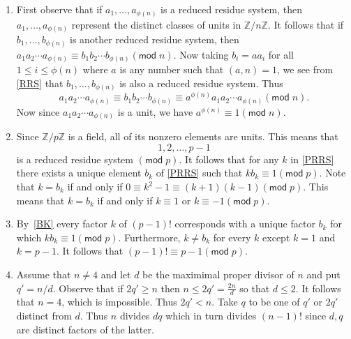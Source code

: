 \documentclass[12pt]{article}
\renewcommand{\pmod}[1]{\left(\mathsf{mod}\;#1\right)}
\begin{document}
\begin{enumerate}
\item %
First observe that if $a_1,\ldots,a_{\phi\left(n\right)}$
is a reduced residue system, then 
$a_1,\ldots,a_{\phi\left(n\right)}$ represent the distinct
classes of units in $\mathbb{Z}/n\mathbb{Z}$.
It follows that if $b_1,\ldots,b_{\phi\left(n\right)}$
is another reduced residue system, then
$a_1a_2\cdots a_{\phi\left(n\right)}
\equiv b_1b_2\cdots b_{\phi\left(n\right)}\pmod{n}$.
Now taking $b_i=aa_i$ for all $1\le i\le\phi\left(n\right)$
where $a$ is any number such that $\left(a,n\right)=1$,
we see from \autoref{RRS} that
$b_1,\ldots,b_{\phi\left(n\right)}$
is also a reduced residue system. Thus
\[a_1a_2\cdots a_{\phi\left(n\right)}
\equiv b_1b_2\cdots b_{\phi\left(n\right)}\equiv
a^{\phi\left(n\right)}a_1a_2\cdots a_{\phi\left(n\right)}
\pmod{n}.\]
Now since
$a_1a_2\cdots a_{\phi\left(n\right)}$ is a unit, we have
$a^{\phi\left(n\right)}\equiv 1\pmod{n}$.

\item\label{BK} %
Since $\mathbb{Z}/p\mathbb{Z}$ is a field, all of its
nonzero elements are units. This means that
\begin{equation}\label{PRRS}
1,2,\ldots,p-1
\end{equation}
is a reduced residue system $\pmod{p}$. It follows
that for any $k$ in \autoref{PRRS} there exists
a unique element $b_k$ of \autoref{PRRS} such that
$kb_k\equiv 1\pmod{p}$.
Note that $k=b_k$ if and only if $0\equiv k^2-1\equiv
\left(k+1\right)\left(k-1\right)\pmod{p}$.
This means that $k=b_k$ if and only if $k\equiv 1$
or $k\equiv -1\pmod{p}$.

\item %
By~\autoref{BK} every factor $k$ of $\left(p-1\right)!$ corresponds
with a unique factor $b_k$ for which $kb_k\equiv 1\pmod{p}$.
Furthermore, $k\ne b_k$ for every $k$ except $k=1$ and $k=p-1$.
It follows that $\left(p-1\right)!\equiv p-1\pmod{p}$.

\item %
Assume that $n\ne 4$ and
let $d$ be the maximimal proper divisor of $n$ and put $q'=n/d$.
Observe that if $2q'\ge n$ then
$n\le 2q'=\frac{2n}{d}$ so that $d\le 2$. It follows that $n=4$,
which is impossible. Thus $2q'<n$. Take $q$ to be one
of $q'$ or $2q'$ distinct from $d$. Thus $n$ divides
$dq$ which in turn divides $\left(n-1\right)!$ since $d,q$ are distinct
factors of the latter.

\end{enumerate}
\end{document}
